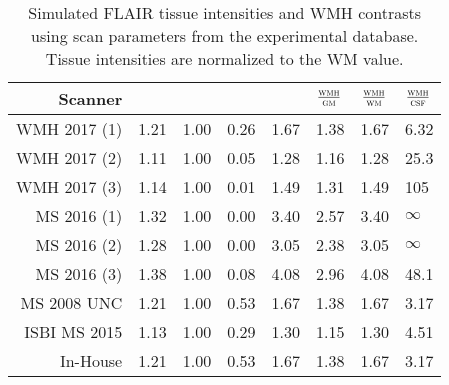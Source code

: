 \begin{table}
  \centering
  \caption{Simulated FLAIR tissue intensities and WMH contrasts using scan parameters from the experimental database. Tissue intensities are normalized to the WM value.}
  \label{tab:simflair}
  \begin{tabu} to 0.7\textwidth{rX[c]X[c]X[c]X[c]X[c]X[c]X[c]}
  	\hline
  	     Scanner & \gm  & \wm  & \csf & \wmh & $\frac{\textsc{wmh}}{\textsc{gm}}$ & $\frac{\textsc{wmh}}{\textsc{wm}}$ & $\frac{\textsc{wmh}}{\textsc{csf}}$ \\ \hline
  	WMH 2017 (1) & 1.21 & 1.00 & 0.26 & 1.67 & 1.38               & 1.67               & 6.32                \\
  	WMH 2017 (2) & 1.11 & 1.00 & 0.05 & 1.28 & 1.16               & 1.28               & 25.3                \\
  	WMH 2017 (3) & 1.14 & 1.00 & 0.01 & 1.49 & 1.31               & 1.49               & 105                 \\
  	MS  2016 (1) & 1.32 & 1.00 & 0.00 & 3.40 & 2.57               & 3.40               & $\infty$            \\
  	MS  2016 (2) & 1.28 & 1.00 & 0.00 & 3.05 & 2.38               & 3.05               & $\infty$            \\
  	MS  2016 (3) & 1.38 & 1.00 & 0.08 & 4.08 & 2.96               & 4.08               & 48.1                \\
  	MS  2008 UNC & 1.21 & 1.00 & 0.53 & 1.67 & 1.38               & 1.67               & 3.17                \\
  	ISBI MS 2015 & 1.13 & 1.00 & 0.29 & 1.30 & 1.15               & 1.30               & 4.51                \\
  	    In-House & 1.21 & 1.00 & 0.53 & 1.67 & 1.38               & 1.67               & 3.17                \\ \hline
  \end{tabu}
\end{table}
